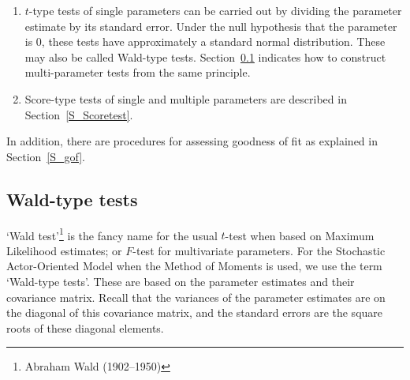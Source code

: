 \documentclass[a4paper,fleqn,11pt]{article}
\newcommand{\+}{\, + \,}
\newcommand{\SAOM}{{Stochastic Actor-Oriented Model }}
\begin{document}
\begin{enumerate}
\item $t$-type tests of single parameters can be carried out by
dividing the parameter estimate by its standard error.
Under the null hypothesis that the parameter is 0,
these tests have approximately a standard normal distribution.
These may also be called Wald-type tests.
Section~\ref{Waldtest} indicates how to construct multi-parameter tests
from the same principle.

\item Score-type tests of single and multiple parameters
      are described in Section~\ref{S_Scoretest}.

\end{enumerate}
In addition, there are procedures for assessing goodness of fit
as explained in Section~\ref{S_gof}.

\subsection{Wald-type tests}
\label{Waldtest}

`Wald test'\footnote{Abraham Wald (1902–1950)}
is the fancy name for the usual $t$-test
when based on Maximum Likelihood estimates;
or $F$-test for multivariate parameters.
For the \SAOM when the Method of Moments is used,
we use the term `Wald-type tests'.
These are based on the parameter estimates and their covariance matrix.
Recall that the variances of the parameter estimates
are on the diagonal of this covariance matrix, and
the standard errors are the square roots of these diagonal
elements.
\end{document}
